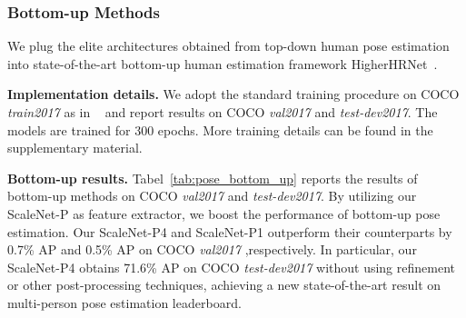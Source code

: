 \documentclass[final]{cvpr}
\newcommand{\netname}{ScaleNet\xspace}
\begin{document}
\begin{table*}
\begin{tabular}{c||c|c|c|c|c|c|c|c|c|c}
\hline
\end{tabular}
\label{tab:pose_top_down}
\end{table*}



\subsubsection{Bottom-up Methods}
We plug the elite architectures obtained from top-down human pose estimation into
state-of-the-art bottom-up human estimation framework HigherHRNet~\cite{cheng2020higherhrnet}. 

\noindent \textbf{Implementation details.}
We adopt the standard training procedure on COCO \textit{train2017} as in ~\cite{newell2017associative, cheng2020higherhrnet} and report results on COCO \textit{val2017} and \textit{test-dev2017}. The models are trained for 300 epochs. More training details can be found in the supplementary material.

\noindent \textbf{Bottom-up results.}
Tabel~\ref{tab:pose_bottom_up} reports the results of bottom-up methods on COCO \textit{val2017} and \textit{test-dev2017}. By utilizing our \netname-P as feature extractor, we boost the performance of bottom-up pose estimation. Our ScaleNet-P4 and ScaleNet-P1 outperform their counterparts by 0.7\% AP and 0.5\% AP on COCO \textit{val2017} ,respectively. In particular, our ScaleNet-P4 obtains 71.6\% AP on COCO \textit{test-dev2017} without using refinement or other post-processing techniques, achieving a new state-of-the-art result on multi-person pose estimation leaderboard.
\end{document}
